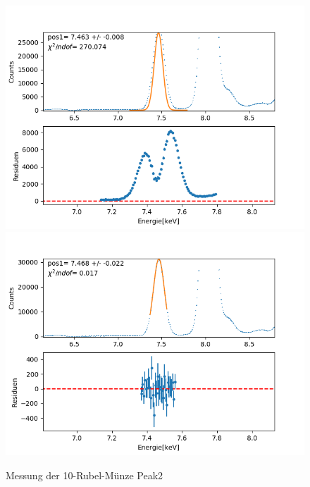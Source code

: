 \documentclass[12pt,a4paper]{article}
\begin{document}
\begin{figure}[H]
\centering
\includegraphics[scale=0.49]{Bilder/roentgen_spektren/rubel/rub3_1.png}
\includegraphics[scale=0.49]{Bilder/roentgen_spektren/rubel/rub3_2.png}
\caption{Messung der 10-Rubel-Münze Peak2}
\end{figure}
\end{document}
